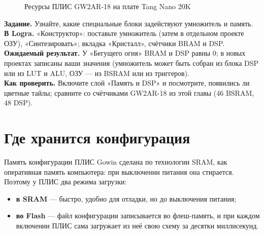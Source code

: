 \begin{figure}[H]
\centering
{}
\caption{Ресурсы ПЛИС GW2AR-18 на плате Tang Nano 20K}
\end{figure}

\begin{diybox}
\textbf{Задание.} Узнайте, какие специальные блоки задействуют умножитель и память.\\
\textbf{В Logra.} «Конструктор»: поставьте умножитель (затем в отдельном проекте ОЗУ), «Синтезировать»; вкладка «Кристалл», счётчики BRAM и DSP.\\
\textbf{Ожидаемый результат.} У «Бегущего огня» BRAM и DSP равны 0; в новых проектах записаны ваши значения (умножитель может быть собран из блока DSP или из LUT и ALU, ОЗУ --- из BSRAM или из триггеров).\\
\textbf{Как проверить.} Включите слой «Память и DSP» и посмотрите, появились ли цветные тайлы; сравните со счётчиками GW2AR-18 из этой главы (46 BSRAM, 48 DSP).
\end{diybox}

\section{Где хранится конфигурация}

Память конфигурации ПЛИС Gowin сделана по технологии SRAM, как
оперативная память компьютера: при выключении питания она стирается. Поэтому
у ПЛИС два режима загрузки:
\begin{itemize}
  \item \textbf{в SRAM} --- быстро, удобно для отладки, но до выключения питания;
  \item \textbf{во Flash} --- файл конфигурации записывается во флеш-память,
        и при каждом включении ПЛИС сама загружает из неё свою схему за
        десятки миллисекунд.
\end{itemize}

